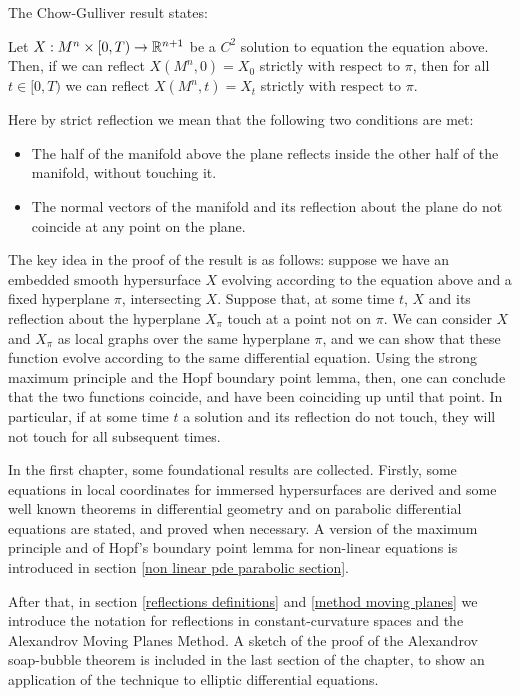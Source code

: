 The Chow-Gulliver result states:

\begin{theorem*}
	Let $X:M^n\times [0,T) \rightarrow \mathbb{R}^{n+1}$ be a $C^2$ solution to equation the equation above. Then, if we can reflect $X(M^n, 0)=X_0$ strictly with respect to $\pi$, then for all $t\in [0,T)$ we can reflect $X(M^n, t)=X_t$ strictly with respect to $\pi$. 
\end{theorem*}

Here by strict reflection we mean that the following two conditions are met: 
\begin{itemize}
	\item The half of the manifold above the plane reflects inside the other half of the manifold, without touching it.
	\item The normal vectors of the manifold and its reflection about the plane do not coincide at any point on the plane.
\end{itemize}

The key idea in the proof of the result is as follows: suppose we have an embedded smooth hypersurface $X$ evolving according to the equation above and a fixed hyperplane $\pi$, intersecting $X$. Suppose that, at some time $t$, $X$ and  its reflection about the hyperplane $X_\pi$ touch at a point not on $\pi$. We can consider $X$ and  $X_\pi$ as local graphs over the same hyperplane $\pi$, and we can show that these function evolve according to the same differential equation. Using the strong maximum principle and the Hopf boundary point lemma, then, one can conclude that the two functions coincide, and have been coinciding up until that point. In particular, if at some time $t$ a solution and its reflection do not touch, they will not touch for all subsequent times. 

In the first chapter, some foundational results are collected. Firstly, some equations in local coordinates for immersed hypersurfaces are derived and some well known theorems in differential geometry and on parabolic differential equations are stated, and proved when necessary. A version of the maximum principle and of Hopf's boundary point lemma for non-linear equations is introduced in section \ref{non linear pde parabolic section}.

After that, in section \ref{reflections definitions} and 
\ref{method moving planes} we introduce the notation for reflections in constant-curvature spaces and the Alexandrov Moving Planes Method. A sketch of the proof of the Alexandrov soap-bubble theorem is included in the last section of the chapter, to show an application of the technique to elliptic differential equations. 

